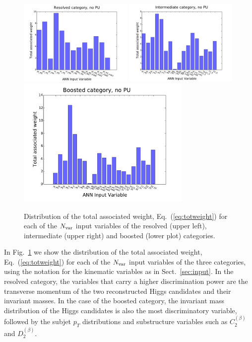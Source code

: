 \begin{figure}[t]
  \begin{center}
    \includegraphics[width=0.49\textwidth]{plots/res_wgthist_noPU.pdf}
\includegraphics[width=0.49\textwidth]{plots/int_wgthist_noPU.pdf}
\includegraphics[width=0.75\textwidth]{plots/bst_wgthist_noPU.pdf}
\vspace{-0.5cm}
\caption{\small
Distribution of the total associated weight,
Eq.~(\ref{eq:totweight}) for each of the $N_{\rm var}$ input
variables of the resolved (upper left),  intermediate (upper right)
and boosted (lower plot)
categories.
}
\label{fig:nnweights}
\end{center}
\end{figure}

%
In Fig.~\ref{fig:nnweights} we show
the distribution of the total associated weight,
Eq.~(\ref{eq:totweight}) for each of the $N_{\rm var}$ input
variables of the three categories, using the
notation for the kinematic variables
as in Sect.~\ref{sec:input}.
%
In the 
resolved category, the variables that carry 
a higher discrimination power
are the transverse momentum of the two reconstructed Higgs candidates and
their invariant masses.
%
In the case of the boosted category, the invariant mass distribution
of the Higgs candidates is also the most discriminatory
variable, followed by the subjet $p_T$ distributions and
substructure variables such as $C_2^{(\beta)}$ and
$D_2^{(\beta)}$.

